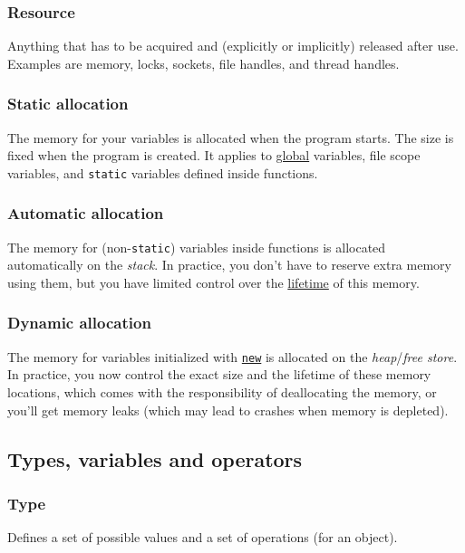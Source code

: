 \documentclass[8pt, table, xcdraw]{article}%
\begin{document}
\subsubsection{Resource} \label{resource}
Anything that has to be acquired and (explicitly or implicitly) released after use. Examples are memory, locks, sockets, file handles, and thread handles.

\subsubsection{Static allocation} \label{staticallocation}
The memory for your variables is allocated when the program starts. The size is fixed when the program is created. It applies to \hyperref[globalscope]{global} variables, file scope variables, and \lstinline{static} variables defined inside functions.

\subsubsection{Automatic allocation} \label{automaticallocation}
The memory for (non-\lstinline{static}) variables inside functions is allocated automatically on the \textit{stack}. In practice, you don't have to reserve extra memory using them, but you have limited control over the \hyperref[localscope]{lifetime} of this memory.

\subsubsection{Dynamic allocation} \label{dynamicallocation}
The memory for variables initialized with \hyperref[new]{\lstinline{new}} is allocated on the \textit{heap}/\textit{free store}. In practice, you now control the exact size and the lifetime of these memory locations, which comes with the responsibility of deallocating the memory, or you'll get memory leaks (which may lead to crashes when memory is depleted).

\subsection{Types, variables and operators}

\subsubsection{Type}
Defines a set of possible values and a set of operations (for an object).
\end{document}
